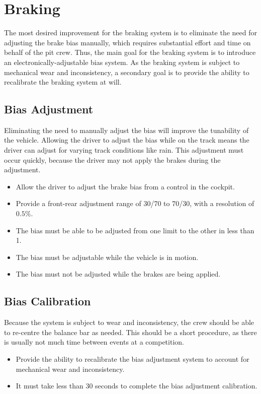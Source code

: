 \section{Braking}

The most desired improvement for the braking system is to eliminate the need for adjusting the brake bias manually, which requires substantial effort and time on behalf of the pit crew. Thus, the main goal for the braking system is to introduce an electronically-adjustable bias system. As the braking system is subject to mechanical wear and inconsistency, a secondary goal is to provide the ability to recalibrate the braking system at will.

\subsection{Bias Adjustment}

Eliminating the need to manually adjust the bias will improve the tunability of the vehicle. Allowing the driver to adjust the bias while on the track means the driver can adjust for varying track conditions like rain. This adjustment must occur quickly, because the driver may not apply the brakes during the adjustment.

\begin{itemize}

\item Allow the driver to adjust the brake bias from a control in the cockpit.
\item Provide a front-rear adjustment range of 30/70 to 70/30, with a resolution of $0.5\%$.
\item The bias must be able to be adjusted from one limit to the other in less than \unit{1}{\second}.
\item The bias must be adjustable while the vehicle is in motion.
\item The bias must not be adjusted while the brakes are being applied.

\end{itemize}

\subsection{Bias Calibration}

Because the system is subject to wear and inconsistency, the crew should be able to re-centre the balance bar as needed. This should be a short procedure, as there is usually not much time between events at a competition.

\begin{itemize}

\item Provide the ability to recalibrate the bias adjustment system to account for mechanical wear and inconsistency. 
\item It must take less than 30 seconds to complete the bias adjustment calibration.

\end{itemize}
